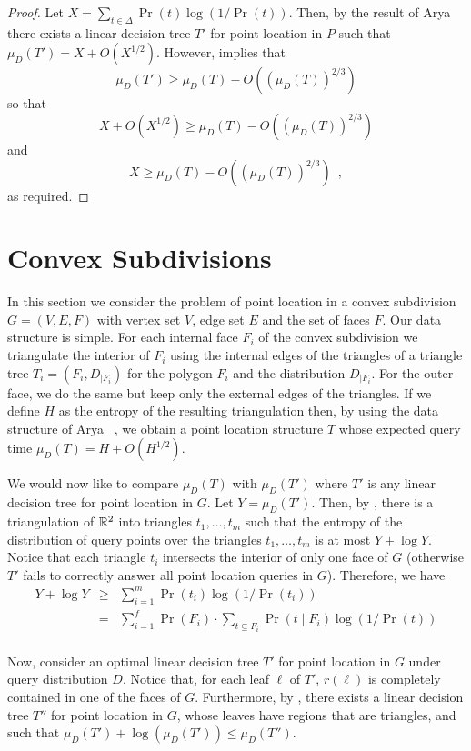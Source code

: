 \documentclass[charterfonts,lotsofwhite]{patmorin}
\begin{document}
\begin{proof}
Let $X=\sum_{t\in \Delta} \Pr(t)\log(1/\Pr(t))$.  Then,
by the result of Arya \etal\ \cite{ammw07} there exists a linear
decision tree $T'$ for point location in $P$ such that 
$\mu_D(T') = X + O(X^{1/2})$.  However,  implies
that
\[
    \mu_D(T') \ge \mu_D(T) - O((\mu_D(T))^{2/3})
\]
so that
\[
    X+O(X^{1/2}) \ge \mu_D(T) - O((\mu_D(T))^{2/3})
\]
and
\[
    X \ge \mu_D(T) - O((\mu_D(T))^{2/3}) \enspace ,
\]
as required.
\end{proof}

\section{Convex Subdivisions}

In this section we consider the problem of point location in a convex
subdivision $G=(V,E,F)$ with vertex set $V$, edge set $E$ and the set
of faces $F$. Our data structure is simple.  For each internal face
$F_i$ of the convex subdivision we triangulate the interior of $F_i$
using the internal edges of the triangles of a triangle tree
$T_i=(F_i,D_{|F_i})$ for the polygon $F_i$ and the distribution
$D_{|F_i}$. For the outer face, we do the same but keep only the
external edges of the triangles.  If we define $H$ as the entropy of
the resulting triangulation then, by using the data structure of Arya
\etal\ \cite{ammw07}, we obtain a point location structure $T$ whose
expected query time $\mu_D(T)=H + O(H^{1/2})$.

We would now like to compare $\mu_D(T)$ with $\mu_D(T')$ where $T'$ is
any linear decision tree for point location in $G$.  Let $Y =
\mu_D(T')$.  Then, by , there is a triangulation of
$\mathbb{R}^2$ into triangles $t_1,\ldots,t_m$ such that the entropy of the
distribution of query points over the triangles $t_1,\ldots,t_m$ is at
most $Y+\log Y$.  Notice that each triangle $t_i$ intersects the
interior of only one face of $G$ (otherwise $T'$ fails to correctly
answer all point location queries in $G$).  Therefore, we have
\begin{eqnarray*}
  Y+\log Y & \ge & \sum_{i=1}^m \Pr(t_i)\log(1/\Pr(t_i)) \\
   & = & \sum_{i=1}^f \Pr(F_i)
        \cdot\sum_{t\subseteq F_i} \Pr(t\mid F_i)\log(1/\Pr(t)) \\
\end{eqnarray*}

Now, consider an optimal linear decision tree $T'$ for point location
in $G$ under query distribution $D$.  Notice that, for each leaf
$\ell$ of $T'$, $r(\ell)$ is completely contained in one of the faces
of $G$.  Furthermore, by , there exists a linear
decision tree $T''$ for point location in $G$, whose leaves have
regions that are triangles, and such that $\mu_{D}(T') +
\log(\mu_D(T')) \le \mu_D(T'')$.
\end{document}
